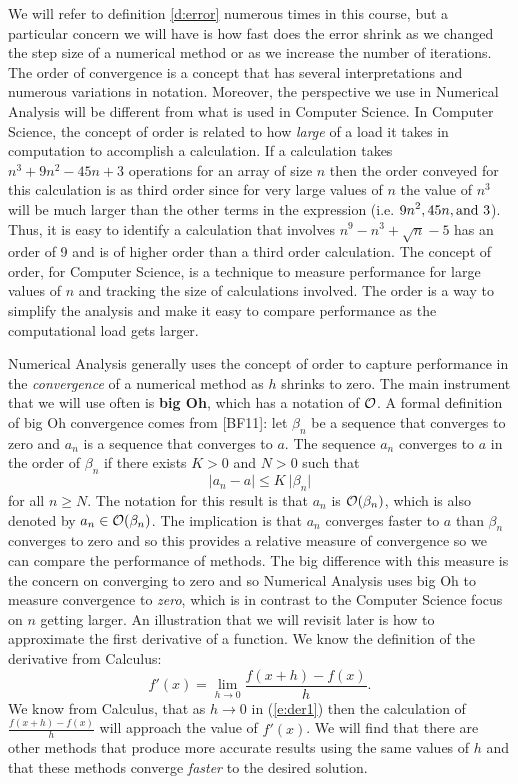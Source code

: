 \documentclass[twoside]{article}
\renewcommand{\cite}[1]{[#1]}
\def\ds{\displaystyle}
\begin{document}
We will refer to definition \ref{d:error} numerous times in this course, but a particular concern we will have is how fast does the error shrink as we changed the step size of a numerical method or as we increase the number of iterations. The order of convergence is a concept that has several interpretations and numerous variations in notation. Moreover, the perspective we use in Numerical Analysis will be different from what is used in Computer Science. In Computer Science, the concept of order is related to how {\it large} of a load it takes in computation to accomplish a calculation. If a calculation takes $\ds n^3 + 9n^2 - 45n+3$ operations for an array of size $n$ then the order conveyed for this calculation is as third order since for very large values of $n$ the value of $n^3$  will be much larger than the other terms in the expression (i.e. $\ds 9n^2, 45n, {\rm and} \ 3$). Thus, it is easy to identify a calculation that involves $\ds n^9-n^3+\sqrt{n}-5$ has an order of 9 and is of higher order than a third order calculation. The concept of order, for Computer Science, is a technique to measure performance for large values of $n$ and tracking the size of calculations involved. The order is a way to simplify the analysis and make it easy to compare performance as the computational load gets larger. \par

Numerical Analysis generally uses the concept of order to capture performance in the {\it convergence} of a numerical method as $h$ shrinks to zero. The main instrument that we will use often is {\bf big Oh}, which has a notation of $\cal O$. A formal definition of big Oh convergence comes from \cite{BF11}: let $\ds \beta_n$ be a sequence that converges to zero and $\ds a_n$ is a sequence that converges to $a$. The sequence $a_n$ converges to $a$ in the order of $\ds \beta_n$ if there exists $K>0$ and $N>0$ such that
\begin{equation}
\vert a_n-a \vert \le K \ \vert \beta_n\vert
\label{e:order_in_Burden}
\end{equation}
for all $n \ge N$. The notation for this result is that $a_n$ is ${\cal O}(\beta_n)$, which is also denoted by $\ds a_n \in {\cal O}(\beta_n)$. The implication is that $a_n$ converges faster to $a$ than $\beta_n$ converges to zero and so this provides a relative measure of convergence so we can compare the performance of methods. The big difference with this measure is the concern on converging to zero and so Numerical Analysis uses big Oh to measure convergence to {\it zero}, which is in contrast to the Computer Science focus on $n$ getting larger. An illustration that we will revisit later is how to approximate the first derivative of a function. We know the definition of the derivative from Calculus:
\begin{equation}
f'(x) = \lim_{h\rightarrow 0} \frac {f(x+h)-f(x)}h.
\label{e:der1}
\end{equation}
We know from Calculus, that as $h \rightarrow 0$ in (\ref{e:der1}) then the calculation of $\ds  \frac {f(x+h)-f(x)}h$ will approach the value of $\ds f'(x)$. We will find that there are other methods that produce more accurate results using the same values of $h$ and that these methods converge {\it faster} to the desired solution. 
\end{document}
